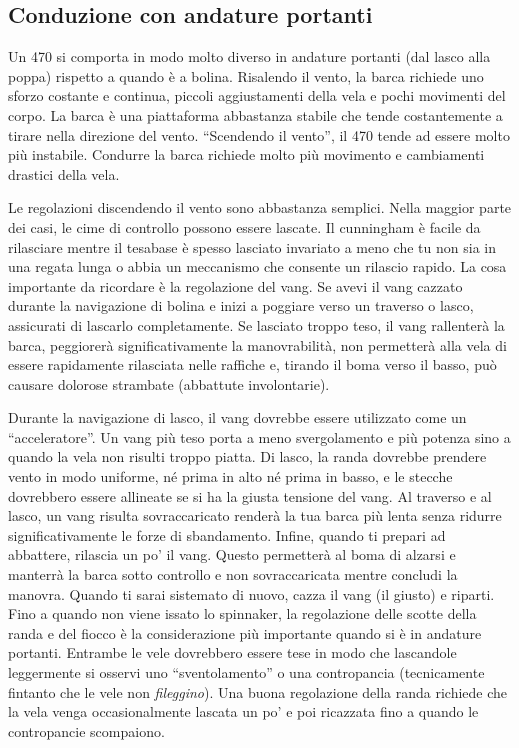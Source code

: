 
\subsection{Conduzione con andature portanti}
\label{sec:conduzione_andature_portanti}
Un 470 si comporta in modo molto diverso in andature portanti (dal lasco alla poppa)
rispetto a quando è a bolina. Risalendo il vento, la barca richiede uno sforzo
costante e continua, piccoli aggiustamenti della vela e pochi movimenti
del corpo. La barca è una piattaforma abbastanza stabile che tende costantemente
a tirare nella direzione del vento. ``Scendendo il vento'', il 470 tende ad essere molto più instabile.
Condurre la barca richiede molto più movimento e cambiamenti drastici della
vela.

Le regolazioni discendendo il vento sono abbastanza semplici. Nella maggior parte
dei casi, le cime di controllo possono essere lascate. Il cunningham è facile
da rilasciare mentre il tesabase è spesso lasciato invariato a meno che tu non sia in
una regata lunga o abbia un meccanismo che consente un rilascio rapido. La cosa importante da
ricordare è la regolazione del vang. Se avevi il vang cazzato durante la
navigazione di
bolina e inizi a poggiare verso un traverso o lasco, assicurati di lascarlo
completamente. Se lasciato troppo teso, il vang rallenterà la barca, peggiorerà significativamente la
manovrabilità, non permetterà alla vela di essere rapidamente rilasciata nelle
raffiche e, tirando il boma verso il basso, può causare dolorose strambate
(abbattute involontarie).

Durante la navigazione di lasco, il vang dovrebbe essere utilizzato come un
``acceleratore''. Un vang più teso porta a
meno svergolamento e più potenza sino a quando la vela non risulti troppo
piatta. Di lasco, la randa dovrebbe prendere vento in modo uniforme, né prima in
alto né prima in basso, e le stecche dovrebbero essere allineate se si ha la
giusta tensione del vang. Al traverso e al lasco, un vang risulta sovraccaricato renderà la tua barca più
lenta senza ridurre significativamente le forze di sbandamento. Infine, quando
ti prepari ad abbattere, rilascia un po' il vang. Questo permetterà al boma di
alzarsi e manterrà la barca sotto controllo e non sovraccaricata mentre concludi
la manovra. Quando ti sarai sistemato di nuovo, cazza il vang (il giusto) e
riparti. Fino a quando non viene issato lo spinnaker, la regolazione delle
scotte della randa e del fiocco è la considerazione più importante quando si è
in andature portanti. Entrambe le vele dovrebbero essere tese in modo che
lascandole leggermente si osservi uno ``sventolamento'' o una contropancia
(tecnicamente fintanto che le vele non \emph{fileggino}). Una
buona regolazione della randa richiede che la vela venga occasionalmente
lascata un po' e poi ricazzata fino a quando le contropancie scompaiono.

